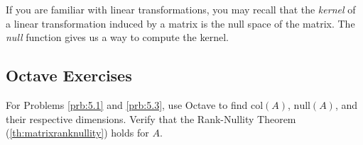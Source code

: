 \documentclass{ximera}
\begin{document}






If you are familiar with linear transformations, you may recall that the \emph{kernel} of a linear transformation induced by a matrix is the null space of the matrix.  The \emph{null} function gives us a way to compute the kernel.

\subsection*{Octave Exercises}
For Problems \ref{prb:5.1} and \ref{prb:5.3}, use Octave to find $\text{col}(A)$, $\text{null}(A)$, and their respective dimensions.  Verify that the Rank-Nullity Theorem (\ref{th:matrixranknullity}) holds for $A$.
\end{document}
